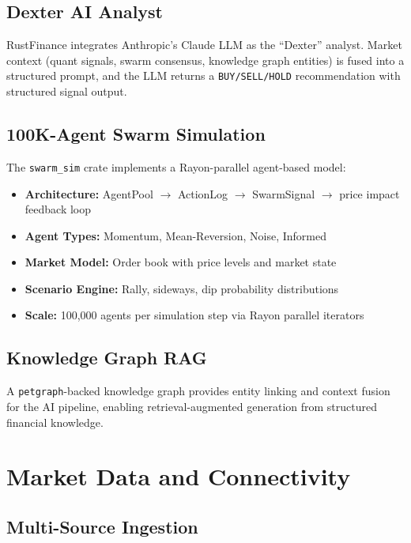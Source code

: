 \documentclass[11pt]{article}
\theoremstyle{definition}
\begin{document}
\subsection{Dexter AI Analyst}

RustFinance integrates Anthropic's Claude LLM as the ``Dexter''
analyst. Market context (quant signals, swarm consensus,
knowledge graph entities) is fused into a structured prompt,
and the LLM returns a \texttt{BUY/SELL/HOLD} recommendation
with structured signal output.

\subsection{100K-Agent Swarm Simulation}

The \texttt{swarm\_sim} crate implements a Rayon-parallel
agent-based model:
\begin{itemize}[leftmargin=*,topsep=2pt,itemsep=1pt]
  \item \textbf{Architecture:} AgentPool $\to$ ActionLog
        $\to$ SwarmSignal $\to$ price impact feedback loop
  \item \textbf{Agent Types:} Momentum, Mean-Reversion,
        Noise, Informed
  \item \textbf{Market Model:} Order book with price levels
        and market state
  \item \textbf{Scenario Engine:} Rally, sideways, dip
        probability distributions
  \item \textbf{Scale:} 100,000 agents per simulation step
        via Rayon parallel iterators
\end{itemize}

\subsection{Knowledge Graph RAG}

A \texttt{petgraph}-backed knowledge graph provides entity
linking and context fusion for the AI pipeline, enabling
retrieval-augmented generation from structured financial
knowledge.

\section{Market Data and Connectivity}
\label{sec:data}

\subsection{Multi-Source Ingestion}
\end{document}
